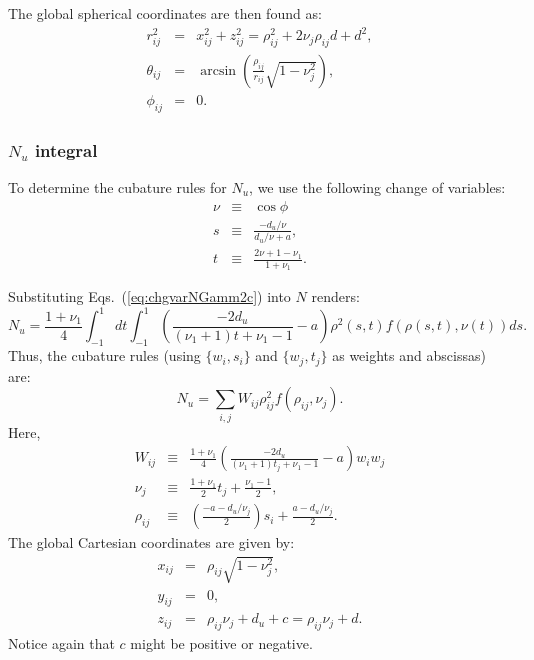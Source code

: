 \documentclass[11pt]{amsart}
\begin{document}
The global spherical coordinates are then found as:
%
\begin{subequations}
\begin{eqnarray}
	r_{ij}^2 & = & x_{ij}^2+z_{ij}^2=\rho_{ij}^2+2\nu_j\rho_{ij}d+d^2,\\
	\theta_{ij}& = & \arcsin\left(\frac{\rho_{ij}}{r_{ij}}\sqrt{1-\nu_j^2}\right),\\
	\phi_{ij} & = & 0.
\end{eqnarray}
\end{subequations}
%

\subsubsection{$N_u$ integral}
To determine the cubature rules for $N_u$, we use the following change of variables:
%
\begin{subequations}\label{eq:chgvarNGamm2c}
\begin{eqnarray}
	\nu & \equiv & \cos\phi\\
	s & \equiv & \frac{-d_u/\nu}{d_u/\nu+a},\\
	t & \equiv & \frac{2\nu+1-\nu_1}{1+\nu_1}.
\end{eqnarray}
\end{subequations}
%

Substituting Eqs.~(\ref{eq:chgvarNGamm2c}) into $N$ renders:
%
\begin{equation}
	N_u=\frac{1+\nu_1}{4}\int_{-1}^1dt\int_{-1}^1\left(\frac{-2d_u}%
		{(\nu_1+1)t+\nu_1-1}-a\right)
		\rho^2(s,t)f(\rho(s,t),\nu(t))ds.
\end{equation}
%
Thus, the cubature rules (using $\{w_i,s_i\}$ and $\{w_j,t_j\}$ as weights and abscissas) are:
%
\begin{equation}
	N_u=\sum_{i,j}W_{ij}
		\rho^2_{ij}f(\rho_{ij},\nu_j).
\end{equation}
%
Here,
%
\begin{subequations}\label{eq:nujrhoijNupDefs}
\begin{eqnarray}
	W_{ij} & \equiv & \frac{1+\nu_1}{4}%
	\left(\frac{-2d_u}{(\nu_1+1)t_j+\nu_1-1}-a\right)w_iw_j\\
	\nu_j & \equiv & \frac{1+\nu_1}{2}t_j+\frac{\nu_1-1}{2},\\
	\rho_{ij} & \equiv & \left(\frac{-a-d_u/\nu_j}{2}\right)s_i
	             + \frac{a-d_u/\nu_j}{2}.
\end{eqnarray}
\end{subequations}
%
The global Cartesian coordinates are given by:
%
\begin{subequations}
\begin{eqnarray}
	x_{ij} & = & \rho_{ij}\sqrt{1-\nu_j^2},\\
	y_{ij}& = & 0,\\
	z_{ij} & = & \rho_{ij}\nu_j+d_u+c=\rho_{ij}\nu_j+d.
\end{eqnarray}
\end{subequations}
%
Notice again that $c$ might be positive or negative.
\end{document}
